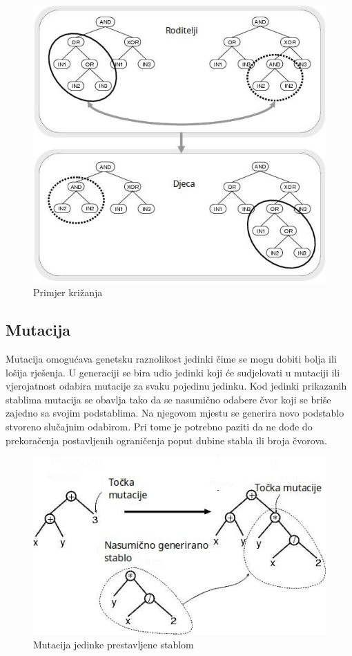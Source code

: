 \documentclass[times, utf8, zavrsni]{fer}
\begin{document}
\begin{figure}[htb]
\centering
\includegraphics[scale=0.6]{images/krizanje}
\caption{Primjer križanja}
\end{figure}

\subsection{Mutacija}
Mutacija omogućava genetsku raznolikost jedinki čime se mogu dobiti bolja ili lošija rješenja. U generaciji se bira udio jedinki koji će sudjelovati u mutaciji ili vjerojatnost odabira mutacije za svaku pojedinu jedinku. Kod jedinki prikazanih stablima mutacija se obavlja tako da se nasumično odabere čvor koji se briše zajedno sa svojim podstablima. Na njegovom mjestu se generira novo podstablo stvoreno slučajnim odabirom. Pri tome je potrebno paziti da ne dođe do prekoračenja postavljenih ograničenja poput dubine stabla ili broja čvorova.


\begin{figure}[htb]
\centering
\includegraphics[scale=0.6]{images/mutacija}
\caption{Mutacija jedinke prestavljene stablom}
\end{figure}
\end{document}
